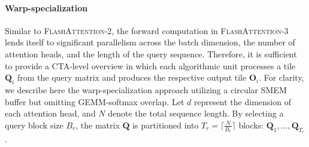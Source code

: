 \paragraph{Warp-specialization}
Similar to \textsc{FlashAttention-2}, the forward computation in \textsc{FlashAttention-3} lends itself to significant parallelism across the batch dimension, the number of attention heads, and the length of the query sequence. Therefore, it is sufficient to provide a CTA-level overview in which each algorithmic unit processes a tile $\mathbf{Q}_i$ from the query matrix and produces the respective output tile $\mathbf{O}_i$. For clarity, we describe here the warp-specialization approach utilizing a circular SMEM buffer but omitting GEMM-softmax overlap. Let $d$ represent the dimension of each attention head, and $N$ denote the total sequence length. By selecting a query block size $B_r$, the matrix $\mathbf{Q}$ is partitioned into $T_r = \lceil \frac{N}{B_r} \rceil$ blocks: $\mathbf{Q}_1, \dots, \mathbf{Q}_{T_r}$.

